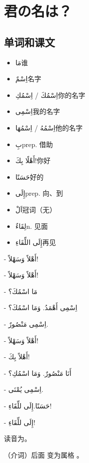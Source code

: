 \chapter{君の名は？}

\section{单词和课文}

\begin{itemize}
    \item \ac{مَا}{谁}
    \item \ac{اِسْمٌ}{名字}
    \item \ac{اِسْمُكَ / اِسْمُكِ}{你的名字}
    \item \ac{اِسْمِى}{我的名字}
    \item \ac{اِسْمُهُ / اِسْمُهَا}{他的名字}
    \item \ac{بِ}{prep. 借助}
    \item \ac{أَهْلًا بِكَ!}{你好}
    \item \ac{حَسَنًا}{好的}
    \item \ac{إِلَى}{prep. 向、到}
    \item \ac{اَلْ}{冠词（无）}
    \item \ac{لِقَاءٌ}{n. 见面}
    \item \ac{إِلَى اللِّقَاءِ}{再见}
\end{itemize}

\begin{Arabic}
    - أَهْلاً وَسَهْلاً! 

    - أَهْلاً وَسَهْلاً!

    - مَا اسْمُكَ؟

    - اِسْمِى أَهْمَدُ. وَمَا اسْمُكَ؟

    - اِسْمِى مَنْصُورٌ.

    - أَهْلاً وَسَهْلاً!

    - أَهْلاً بِكَ!

    - أَنَا مَنْصُورٌ. وَمَا اسْمُكِ؟

    - اِسْمِى يُمْنَى.

    - حَسَنًا.إِلَى للِّقَاءِ!

    - إِلَى للِّقَاءِ! 
\end{Arabic}

\begin{note}
    读音为。

     （介词）后面  变为属格  。
\end{note}

